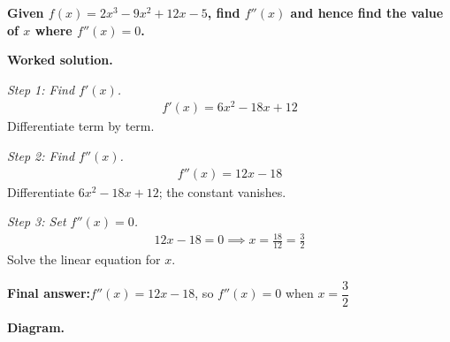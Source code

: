 \documentclass[11pt]{article}
\newcommand{\question}[1]{\par\medskip\noindent\textbf{#1}\par}
\begin{document}
\question{Given \( f(x) = 2x^3 - 9x^2 + 12x - 5 \), find \( f''(x) \) and hence find the value of \( x \) where \( f''(x) = 0 \).}

\textbf{Worked solution.}

\textit{Step 1: Find \( f'(x) \).}
\[\begin{gathered}
f'(x) = 6x^2 - 18x + 12
\end{gathered}\]
Differentiate term by term.

\textit{Step 2: Find \( f''(x) \).}
\[\begin{gathered}
f''(x) = 12x - 18
\end{gathered}\]
Differentiate \(6x^2 - 18x + 12\); the constant vanishes.

\textit{Step 3: Set \( f''(x) = 0 \).}
\[\begin{gathered}
12x - 18 = 0 \implies x = \frac{18}{12} = \frac{3}{2}
\end{gathered}\]
Solve the linear equation for \( x \).

\begin{answerbox}
\textbf{Final answer:}\quad \(\displaystyle  f''(x) = 12x - 18 \), so \(\displaystyle  f''(x) = 0 \) when \(\displaystyle  x = \dfrac{3}{2} \)
\end{answerbox}
\textbf{Diagram.}
\end{document}
